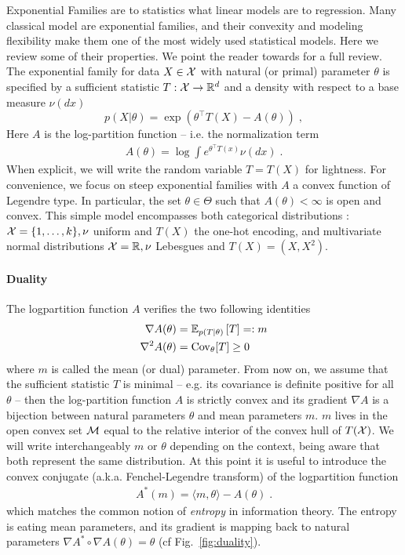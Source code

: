 \documentclass[twoside]{article}
\newcommand*{\expect}[2][]{\ensuremath{\mathbb{E}_{#1} \left[ #2 \right] }} %
\newcommand{\logpart}{A}
\newcommand{\conj}{\logpart^*}
\newcommand{\nat}{\theta}
\newcommand{\m}{m}
\newcommand{\meanp}{\m}
\begin{document}
Exponential Families are to statistics what linear models are to regression.
Many classical model are exponential families, and their convexity and modeling flexibility make them one of the most widely used statistical models. 
Here we review some of their properties. 
We point the reader towards \citet[Chapter 3]{wainwright2008graphical} for a full review.
The exponential family for data $X\in {\mathcal X}$ with natural (or primal) parameter $\nat$  is specified by a sufficient statistic $T: {\mathcal X} \rightarrow \mathbb{R}^d$ and a density with respect to a base measure $\nu(dx)$
\begin{equation}
	 p(X|\nat) = \exp( \nat^\top T(X) - \logpart(\nat)) \; ,
\end{equation}
Here $\logpart$ is the log-partition function -- i.e. the normalization term
\begin{align}
    \logpart(\nat) = \log \int e^{\nat^\top T(x)} \nu(dx) \; .
\end{align}
When explicit, we will write the random variable $T = T(X)$ for lightness.
For convenience, we focus on steep exponential families with $\logpart$ a convex function of Legendre type.
In particular, the set $\nat \in \Theta$ such that $\logpart(\nat) < \infty$ is open and convex.
This simple model encompasses both categorical distributions : ${\mathcal X} = \{1, \dots, k\}, \nu$ uniform and $T(X)$  the one-hot encoding, and multivariate normal distributions ${\mathcal X}=\mathbb{R}, \nu$ Lebesgues and $T(X)=(X, X^2)$. 


\paragraph{Duality}
The logpartition function $\logpart$ verifies the two following identities
\begin{align}
    \nabla\logpart(\nat) &=  \expect[p(T|\nat)]{T} =: \meanp \\
    \nabla^2 \logpart(\nat) &= \Cov_\nat[T] \geq 0
\end{align}
where $\meanp$ is called the mean (or dual) parameter.
From now on, we assume that the sufficient statistic $T$ is minimal 
-- e.g. its covariance is definite positive for all $\nat$ -- 
then the log-partition function $\logpart$ is strictly convex and its gradient $\nabla \logpart$ is a bijection between natural parameters $\nat$ and mean parameters $\m$.
$\meanp$ lives in the open convex set ${\mathcal M}$ equal to the relative interior of the convex hull of $T({\mathcal X})$.
We will write interchangeably $\m$ or  $\nat$ depending on the context, being aware that both represent the same distribution.
At this point it is useful to introduce the convex conjugate (a.k.a. Fenchel-Legendre transform) of the logpartition function
\begin{align}
	\conj(\m) = \langle \m, \nat \rangle - \logpart(\nat) \; .
\end{align}
which matches the common notion of \textit{entropy} in information theory.
The entropy is eating mean parameters, and its gradient is mapping back to natural parameters $\nabla\conj \circ \nabla\logpart(\nat) = \nat$ (cf Fig.~\ref{fig:duality}).
\end{document}
